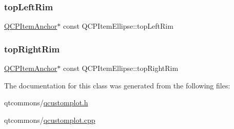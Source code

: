 \mbox{\label{class_q_c_p_item_ellipse_a33ebd2a751b63b9240edc9aa46c19eff}} 
\subsubsection{\texorpdfstring{topLeftRim}{topLeftRim}}
{\footnotesize\ttfamily \mbox{\hyperlink{class_q_c_p_item_anchor}{Q\+C\+P\+Item\+Anchor}}$\ast$ const Q\+C\+P\+Item\+Ellipse\+::top\+Left\+Rim}

\mbox{\label{class_q_c_p_item_ellipse_a744446970b38a4a3bbea46d722b7c54d}} 
\subsubsection{\texorpdfstring{topRightRim}{topRightRim}}
{\footnotesize\ttfamily \mbox{\hyperlink{class_q_c_p_item_anchor}{Q\+C\+P\+Item\+Anchor}}$\ast$ const Q\+C\+P\+Item\+Ellipse\+::top\+Right\+Rim}



The documentation for this class was generated from the following files\+:\begin{DoxyCompactItemize}
\item 
qtcommons/\mbox{\hyperlink{qcustomplot_8h}{qcustomplot.\+h}}\item 
qtcommons/\mbox{\hyperlink{qcustomplot_8cpp}{qcustomplot.\+cpp}}\end{DoxyCompactItemize}
